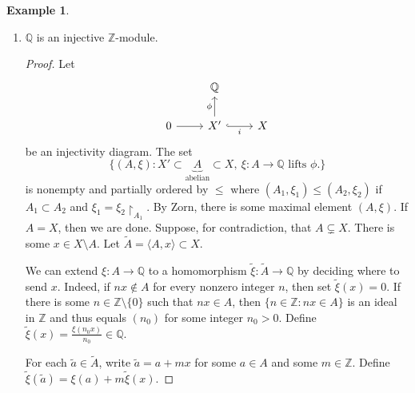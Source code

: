 \documentclass[10pt,letterpaper,cm]{nupset}
\theoremstyle{definition}
\newtheorem{exmp}{Example}
\newcommand{\Q}{\mathbb Q}
\newcommand{\Z}{\mathbb Z}
\newcommand{\1}{\mathbf{1}}
\newcommand{\0}{\vec 0}
\begin{document}
\begin{exmp} $ $
\begin{enumerate}
\item $\Q$ is an injective $\Z$-module.
\begin{proof}
Let \[
\begin{tikzcd}
 & \Q &  \\
0 \arrow[r] & X' \arrow[r, "i"', hook] \arrow[u, "\phi"] & X
\end{tikzcd}
\] be an injectivity diagram. The set $$\{ (A, \xi) : X' \subset \underbrace{A}_{\text{abelian}} \subset X, \ \xi : A \to \Q \text{ lifts } \phi.  \}$$ is nonempty and partially ordered  by $\leq$ where $(A_1, \xi_1) \leq (A_2, \xi_2)$ if $A_1 \subset A_2$ and $\xi_1 = \xi_2\restriction_{A_1}$. By Zorn, there is some maximal element $(A, \xi)$. If $A = X$, then we are done. Suppose, for contradiction, that $A \subsetneq X$. There is some $x\in X \setminus A$. Let $\tilde{A} = \langle A, x\rangle \subset X$. 

We can extend $\xi : A \to \Q$ to a homomorphism $\tilde{\xi} : \tilde{A} \to \Q$ by deciding where to send $x$. Indeed, if $nx \notin A$ for every nonzero integer $n$, then set $\tilde{\xi}(x) = 0$. If there is some $n\in \Z \setminus \{0\}$ such that $nx \in A$, then $\{n \in \Z : nx \in A\}$ is an ideal in $\Z$ and thus equals $(n_0)$ for some integer $n_0 >0$. Define $\tilde{\xi}(x) = \frac{\xi(n_0x)}{n_0} \in \Q$. 

For each $\tilde{a} \in \tilde{A}$, write $\tilde{a} = a + mx$ for some $a\in A$ and some $m\in \Z$. Define $\tilde{\xi}(\tilde{a}) = \xi(a) + m\tilde{\xi}(x)$.


\end{proof}
\end{enumerate}
\end{exmp}
\end{document}
